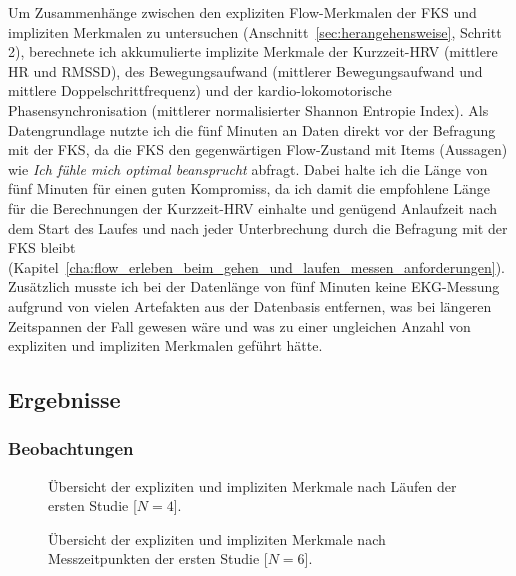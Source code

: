 Um Zusammenhänge zwischen den expliziten Flow-Merkmalen der \ac{FKS} und impliziten Merkmalen zu untersuchen (Anschnitt~\ref{sec:herangehensweise}, Schritt 2), berechnete ich akkumulierte implizite Merkmale der Kurzzeit-\ac{HRV} (mittlere \ac{HR} und \acs{RMSSD}), des Bewegungsaufwand (mittlerer Bewegungsaufwand und mittlere Doppelschrittfrequenz) und der kardio-lokomotorische Phasensynchronisation (mittlerer normalisierter Shannon Entropie Index). Als Datengrundlage nutzte ich die fünf Minuten an Daten direkt vor der Befragung mit der \ac{FKS}, da die \ac{FKS} den gegenwärtigen Flow-Zustand mit Items (Aussagen) wie \emph{Ich fühle mich optimal beansprucht} abfragt. Dabei halte ich die Länge von fünf Minuten für einen guten Kompromiss, da ich damit die empfohlene Länge für die Berechnungen der Kurzzeit-\ac{HRV} \citep[][S.~360]{TaskForce1996} einhalte und genügend Anlaufzeit nach dem Start des Laufes und nach jeder Unterbrechung durch die Befragung mit der \ac{FKS} bleibt (Kapitel~\ref{cha:flow_erleben_beim_gehen_und_laufen_messen_anforderungen}). Zusätzlich musste ich bei der Datenlänge von fünf Minuten keine \ac{EKG}-Messung aufgrund von vielen Artefakten aus der Datenbasis entfernen, was bei längeren Zeitspannen der Fall gewesen wäre und was zu einer ungleichen Anzahl von expliziten und impliziten Merkmalen geführt hätte.

\subsection{Ergebnisse} 

\label{sub:ergebnisse_5_1}

\subsubsection{Beobachtungen} 

\label{ssub:beobachtungen_5_1} 
\begin{figure}
	[!htb]  \caption[Übersicht der expliziten und impliziten Merkmale nach Läufen der ersten Studie.]{Übersicht der expliziten und impliziten Merkmale nach Läufen der ersten Studie [$N = 4$].} \label{fig:ubersicht_nach_laufen_1} 
\end{figure}
\begin{figure}
	[!htb]  \caption[Übersicht der expliziten und impliziten Merkmale nach Messzeitpunkten der ersten Studie.]{Übersicht der expliziten und impliziten Merkmale nach Messzeitpunkten der ersten Studie [$N = 6$].} \label{fig:ubersicht_nach_messzeitpunkten_1} 
\end{figure}

